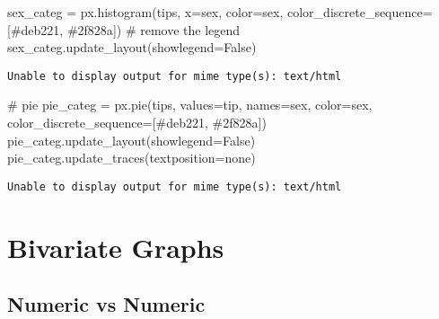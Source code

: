 \documentclass[
  letterpaper,
  DIV=11,
  numbers=noendperiod]{scrreprt}
\newenvironment{Shaded}{\begin{snugshade}}{\end{snugshade}}
\newcommand{\CommentTok}[1]{\textcolor[rgb]{0.37,0.37,0.37}{#1}}
\newcommand{\NormalTok}[1]{\textcolor[rgb]{0.00,0.23,0.31}{#1}}
\newcommand{\OperatorTok}[1]{\textcolor[rgb]{0.37,0.37,0.37}{#1}}
\newcommand{\StringTok}[1]{\textcolor[rgb]{0.13,0.47,0.30}{#1}}
\newcommand{\VariableTok}[1]{\textcolor[rgb]{0.07,0.07,0.07}{#1}}
\begin{document}
\begin{Shaded}
\begin{Highlighting}[]
\NormalTok{sex\_categ }\OperatorTok{=}\NormalTok{ px.histogram(tips, x}\OperatorTok{=}\StringTok{\textquotesingle{}sex\textquotesingle{}}\NormalTok{, color}\OperatorTok{=}\StringTok{\textquotesingle{}sex\textquotesingle{}}\NormalTok{, color\_discrete\_sequence}\OperatorTok{=}\NormalTok{ [}\StringTok{\textquotesingle{}\#deb221\textquotesingle{}}\NormalTok{, }\StringTok{\textquotesingle{}\#2f828a\textquotesingle{}}\NormalTok{])}
\CommentTok{\# remove the legend}
\NormalTok{sex\_categ.update\_layout(showlegend}\OperatorTok{=}\VariableTok{False}\NormalTok{)}
\end{Highlighting}
\end{Shaded}

\begin{verbatim}
Unable to display output for mime type(s): text/html
\end{verbatim}

\begin{Shaded}
\begin{Highlighting}[]
\CommentTok{\# pie}
\NormalTok{pie\_categ }\OperatorTok{=}\NormalTok{ px.pie(tips, values}\OperatorTok{=}\StringTok{\textquotesingle{}tip\textquotesingle{}}\NormalTok{, names}\OperatorTok{=}\StringTok{\textquotesingle{}sex\textquotesingle{}}\NormalTok{, color}\OperatorTok{=}\StringTok{\textquotesingle{}sex\textquotesingle{}}\NormalTok{, color\_discrete\_sequence}\OperatorTok{=}\NormalTok{[}\StringTok{\textquotesingle{}\#deb221\textquotesingle{}}\NormalTok{, }\StringTok{\textquotesingle{}\#2f828a\textquotesingle{}}\NormalTok{])}
\NormalTok{pie\_categ.update\_layout(showlegend}\OperatorTok{=}\VariableTok{False}\NormalTok{)}
\NormalTok{pie\_categ.update\_traces(textposition}\OperatorTok{=}\StringTok{\textquotesingle{}none\textquotesingle{}}\NormalTok{)}
\end{Highlighting}
\end{Shaded}

\begin{verbatim}
Unable to display output for mime type(s): text/html
\end{verbatim}

\chapter{Bivariate Graphs}\label{bivariate-graphs}

\section{Numeric vs Numeric}\label{numeric-vs-numeric}
\end{document}
